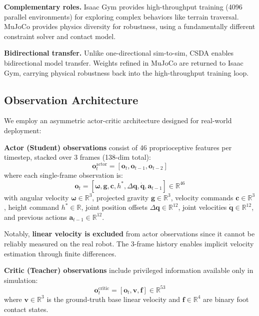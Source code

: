 \documentclass[conference]{IEEEtran}
\begin{document}
\textbf{Complementary roles.} Isaac Gym provides high-throughput training (4096 parallel environments) for exploring complex behaviors like terrain traversal. MuJoCo provides physics diversity for robustness, using a fundamentally different constraint solver and contact model.

\textbf{Bidirectional transfer.} Unlike one-directional sim-to-sim, CSDA enables bidirectional model transfer. Weights refined in MuJoCo are returned to Isaac Gym, carrying physical robustness back into the high-throughput training loop.

\subsection{Observation Architecture}

We employ an asymmetric actor-critic architecture designed for real-world deployment:

\textbf{Actor (Student) observations} consist of 46 proprioceptive features per timestep, stacked over 3 frames (138-dim total):
\begin{equation}
\mathbf{o}_t^{\text{actor}} = [\mathbf{o}_t, \mathbf{o}_{t-1}, \mathbf{o}_{t-2}]
\end{equation}
where each single-frame observation is:
\begin{equation}
\mathbf{o}_t = [\boldsymbol{\omega}, \mathbf{g}, \mathbf{c}, h^*, \Delta\mathbf{q}, \dot{\mathbf{q}}, \mathbf{a}_{t-1}] \in \mathbb{R}^{46}
\end{equation}
with angular velocity $\boldsymbol{\omega} \in \mathbb{R}^3$, projected gravity $\mathbf{g} \in \mathbb{R}^3$, velocity commands $\mathbf{c} \in \mathbb{R}^3$, height command $h^* \in \mathbb{R}$, joint position offsets $\Delta\mathbf{q} \in \mathbb{R}^{12}$, joint velocities $\dot{\mathbf{q}} \in \mathbb{R}^{12}$, and previous actions $\mathbf{a}_{t-1} \in \mathbb{R}^{12}$.

Notably, \textbf{linear velocity is excluded} from actor observations since it cannot be reliably measured on the real robot. The 3-frame history enables implicit velocity estimation through finite differences.

\textbf{Critic (Teacher) observations} include privileged information available only in simulation:
\begin{equation}
\mathbf{o}_t^{\text{critic}} = [\mathbf{o}_t, \mathbf{v}, \mathbf{f}] \in \mathbb{R}^{53}
\end{equation}
where $\mathbf{v} \in \mathbb{R}^3$ is the ground-truth base linear velocity and $\mathbf{f} \in \mathbb{R}^4$ are binary foot contact states.
\end{document}
